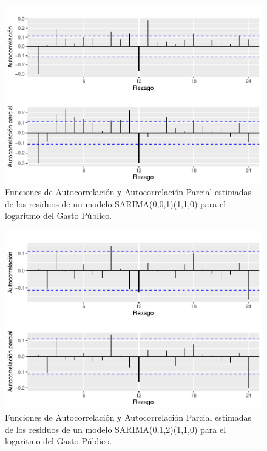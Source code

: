 \documentclass[
  12pt,
]{article}
\begin{document}
\begin{figure}[H]

{\centering \includegraphics[width=0.75\linewidth]{informe_files/figure-latex/unnamed-chunk-31-1} 

}

\caption{\label{facyp_r2} Funciones de Autocorrelación y Autocorrelación Parcial estimadas de los residuos de un modelo SARIMA(0,0,1)(1,1,0) para el logaritmo del Gasto Público.}\label{fig:unnamed-chunk-31}
\end{figure}

\begin{figure}[H]

{\centering \includegraphics[width=0.75\linewidth]{informe_files/figure-latex/unnamed-chunk-32-1} 

}

\caption{\label{facyp_r3} Funciones de Autocorrelación y Autocorrelación Parcial estimadas de los residuos de un modelo SARIMA(0,1,2)(1,1,0) para el logaritmo del Gasto Público.}\label{fig:unnamed-chunk-32}
\end{figure}
\end{document}
